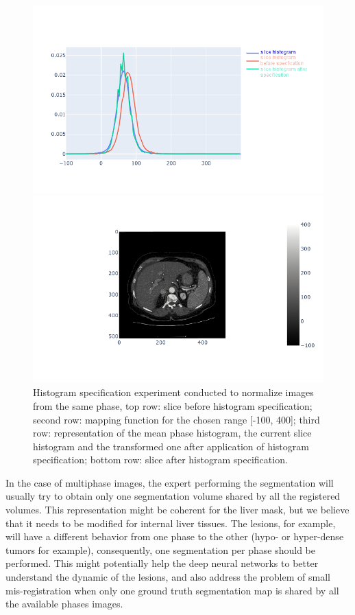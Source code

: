 \begin{figure}[ht!]
\begin{minipage}{0.5\linewidth}
\includegraphics[width=\linewidth]{./images/image2_modified.png}
\end{minipage}
\begin{minipage}{0.5\linewidth}
\includegraphics[width=\linewidth]{./images/image4.png}
\end{minipage}
\caption{Histogram specification experiment conducted to normalize images from the same phase, top row: slice before histogram specification; second row: mapping function for the chosen range [-100, 400]; third row: representation of the mean phase histogram, the current slice histogram and the transformed one after application of histogram specification; bottom row: slice after histogram specification.}
\label{fig:specif}
\end{figure}

In the case of multiphase images, the expert performing the segmentation
will usually try to obtain only one segmentation volume shared by all the 
registered volumes. This representation might be coherent for the liver mask, 
but we believe that it needs to be modified for internal liver tissues. 
The lesions, for example, will have a different behavior from one phase to the other
(hypo- or hyper-dense tumors for example), consequently, one segmentation per phase should
be performed. This might potentially help the deep neural
networks to better understand the dynamic of the lesions, and also
address the problem of small mis-registration when only one ground truth
segmentation map is shared by all the available phases images.

